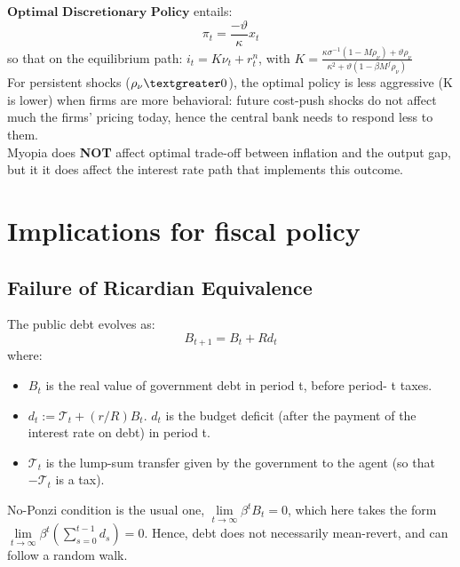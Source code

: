 \documentclass{beamer}
\newcommand\ReduceFont{\fontsize{10}{7.2}\selectfont}
\begin{document}
\begin{frame}{\subsecname}
    $\textbf{Optimal Discretionary Policy}$ entails:
    \begin{equation}\tag{42}
        \pi_{t}=\frac{-\vartheta}{\kappa}x_{t}
    \end{equation}
    so that on the equilibrium path: $i_{t}=K\nu_{t}+r_{t}^{n}$, with $K=\frac{\kappa\sigma^{-1}\left(1-M\rho_{\nu}\right)+\vartheta\rho_{\nu}}{\kappa^{2}+\vartheta\left(1-\beta M^{f}\rho_{\nu}\right)}$\\
    \hfill \linebreak
    For persistent shocks ($\rho_{\nu} \textgreater 0$), the optimal policy is less aggressive (K is lower) when firms are more behavioral: future cost-push shocks do not affect much the firms’ pricing today, hence the central bank needs to respond less to them.\\
    \hfill \linebreak      
    Myopia does \textbf{NOT} affect optimal trade-off between inflation and the output gap, but it it does affect the interest rate path that implements this outcome.
\end{frame}

\section{Implications for fiscal policy}
\begin{frame}
    \ReduceFont
\end{frame}

\begin{frame}
    \tableofcontents[currentsection, hideothersubsections, sections=\value{section}]
\end{frame}

\subsection{Failure of Ricardian Equivalence}

\begin{frame}{\subsecname}
    The public debt evolves as:
    \begin{equation}\tag{43}
        B_{t+1}=B_{t}+R d_{t}
    \end{equation}
    where:
    \begin{itemize}
        \item $B_{t}$ is the real value of government debt in period t, before period- t taxes.
        \item $d_{t}:=\mathcal{T}_{t}+(r/R)B_{t}$. $d_{t}$ is the budget deficit (after the payment of the interest rate on debt) in period t.
        \item $\mathcal{T}_{t}$ is the lump-sum transfer given by the government to the agent (so that $-\mathcal{T}_{t}$ is a tax).
    \end{itemize}
    No-Ponzi condition is the usual one, $\lim\limits_{t\to\infty}\beta^{t}B_{t}=0$, which here takes the form $\lim\limits_{t\to\infty}\beta^{t}\left(\sum_{s=0}^{t-1}d_{s}\right)=0$. Hence, debt does not necessarily mean-revert, and can follow a random walk.
\end{frame}
\end{document}
